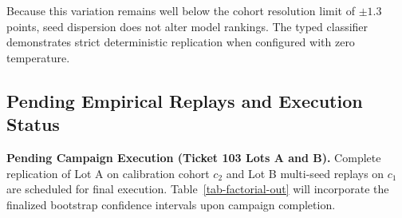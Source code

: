 Because this variation remains well below the cohort resolution limit of $\pm 1.3$ points, seed dispersion does not alter model rankings. The typed classifier demonstrates strict deterministic replication when configured with zero temperature.

\subsection{Pending Empirical Replays and Execution Status}

\textbf{Pending Campaign Execution (Ticket 103 Lots A and B).} Complete replication of Lot A on calibration cohort $c_2$ and Lot B multi-seed replays on $c_1$ are scheduled for final execution. Table~\ref{tab-factorial-out} will incorporate the finalized bootstrap confidence intervals upon campaign completion.
